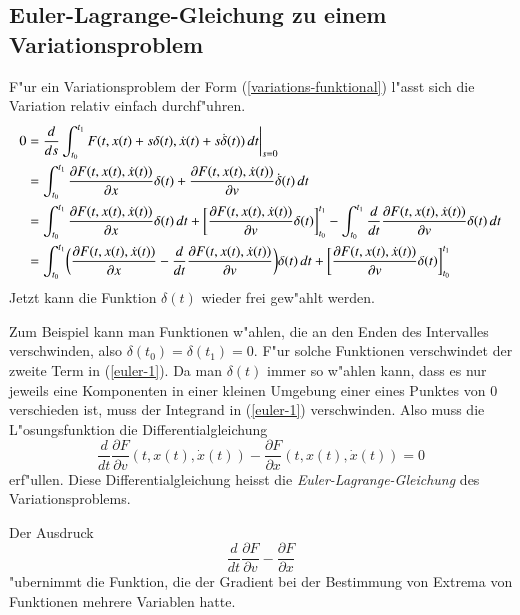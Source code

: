 \subsection{Euler-Lagrange-Gleichung zu einem Variationsproblem}
F"ur ein Variationsproblem der Form (\ref{variations-funktional})
l"asst sich die Variation relativ einfach durchf"uhren.
\begin{align}
0&=
\frac{d}{ds}
\int_{t_0}^{t_1} F(t, x(t) + s\delta(t), \dot x(t)+s\dot\delta(t))\,dt\bigg|_{s=0}
\notag
\\
&=
\int_{t_0}^{t_1} \frac{\partial F(t,x(t),\dot x(t))}{\partial x}\delta(t)
+\frac{\partial F(t,x(t),\dot x(t))}{\partial v}\dot \delta(t)\,dt
\notag
\\
&=
\int_{t_0}^{t_1} \frac{\partial F(t,x(t),\dot x(t))}{\partial x}\delta(t)\,dt
+\biggl[
\frac{\partial F(t,x(t),\dot x(t))}{\partial v}
\delta(t)
\biggr]_{t_0}^{t_1}
-\int_{t_0}^{t_1}\frac{d}{dt}\frac{\partial F(t,x(t),\dot x(t))}{\partial v}
\delta(t)\,dt
\notag
\\
&=
\int_{t_0}^{t_1}
\biggl(
\frac{\partial F(t,x(t),\dot x(t))}{\partial x}
-
\frac{d}{dt}\frac{\partial F(t,x(t),\dot x(t))}{\partial v}
\biggr)\delta(t)
\,dt
+\biggl[
\frac{\partial F(t,x(t),\dot x(t))}{\partial v}
\delta(t)
\biggr]_{t_0}^{t_1}
\label{euler-1}
\end{align}
Jetzt kann die Funktion $\delta(t)$ wieder frei gew"ahlt werden. 

Zum Beispiel kann man Funktionen w"ahlen, die an den Enden des Intervalles
verschwinden, also $\delta(t_0)=\delta(t_1)=0$.
F"ur solche Funktionen verschwindet der zweite Term in
(\ref{euler-1}). Da man $\delta(t)$ immer so w"ahlen kann, dass es
nur jeweils eine Komponenten in einer kleinen Umgebung einer eines
Punktes von $0$ verschieden ist, muss
der Integrand in (\ref{euler-1}) verschwinden.
Also muss die L"osungsfunktion die Differentialgleichung
\begin{equation}
\frac{d}{dt}\frac{\partial F}{\partial v}(t,x(t),\dot x(t))
-
\frac{\partial F}{\partial x}(t,x(t),\dot x(t))
=
0
\label{variation:euler-gleichung}
\end{equation}
erf"ullen. Diese Differentialgleichung heisst die {\it Euler-Lagrange-Gleichung}
des Variationsproblems.

Der Ausdruck
\begin{equation}
\frac{d}{dt}\frac{\partial F}{\partial v}-\frac{\partial F}{\partial x}
\label{variation:gradient}
\end{equation}
"ubernimmt die Funktion, die der Gradient bei der Bestimmung von
Extrema von Funktionen mehrere Variablen hatte.

